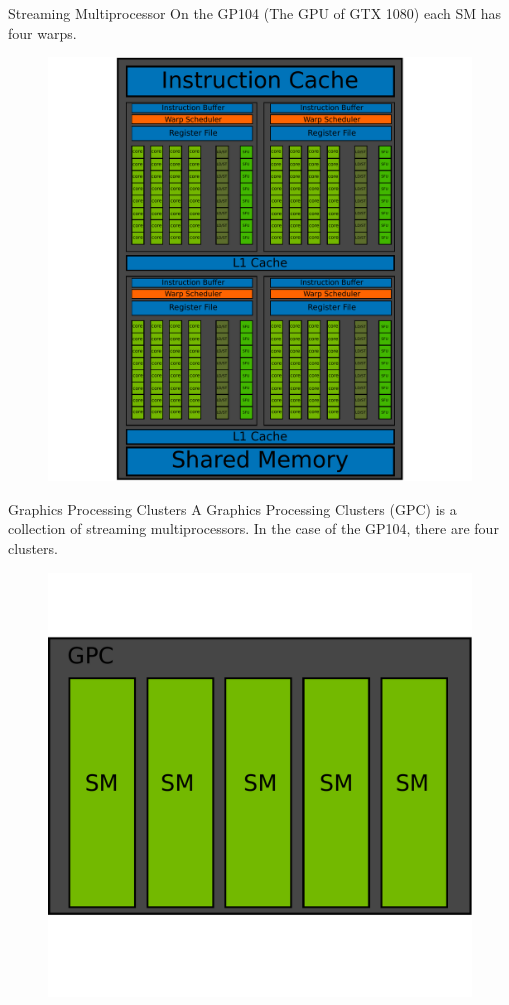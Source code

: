 \documentclass{beamer}
\begin{document}
\begin{frame}{Streaming Multiprocessor}
	On the GP104 (The GPU of GTX 1080) each SM has four warps. 
	\begin{figure}
		\includegraphics[scale=0.3]{figures/SM.pdf}
	\end{figure}
\end{frame}

\begin{frame}{Graphics Processing Clusters}
	A Graphics Processing Clusters (GPC) is a collection of streaming multiprocessors. In the case of the GP104, there are four clusters.
	\begin{figure}
		\includegraphics[scale=0.3]{figures/GPC.pdf}
	\end{figure}
\end{frame}
\end{document}
